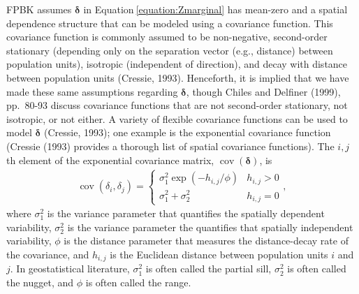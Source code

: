 \documentclass[]{elsarticle} %
\begin{document}
FPBK assumes \(\bm{\delta}\) in Equation\(~\)\ref{equation:Zmarginal}
has mean-zero and a spatial dependence structure that can be modeled
using a covariance function. This covariance function is commonly
assumed to be non-negative, second-order stationary (depending only on
the separation vector (e.g., distance) between population units),
isotropic (independent of direction), and decay with distance between
population units (Cressie, 1993). Henceforth, it is implied that we have
made these same assumptions regarding \(\bm{\delta}\), though Chiles and
Delfiner (1999), pp.~80-93 discuss covariance functions that are not
second-order stationary, not isotropic, or not either. A variety of
flexible covariance functions can be used to model \(\bm{\delta}\)
(Cressie, 1993); one example is the exponential covariance function
(Cressie (1993) provides a thorough list of spatial covariance
functions). The \(i,j\)th element of the exponential covariance matrix,
\(\mathop{\mathrm{{cov}}}(\bm{\delta})\), is \mbox{}
\begin{align}\label{equation:expcov}
\mathop{\mathrm{{cov}}}(\delta_i, \delta_j) = 
\begin{cases} 
\sigma^2_{1}\exp(-h_{i,j}/\phi) & h_{i,j} > 0 \\
\sigma^2_{1} + \sigma^2_2 & h_{i,j} = 0
\end{cases}
,
\end{align} where \(\sigma^2_{1}\) is the variance parameter that
quantifies the spatially dependent variability, \(\sigma^2_{2}\) is the
variance parameter the quantifies that spatially independent
variability, \(\phi\) is the distance parameter that measures the
distance-decay rate of the covariance, and \(h_{i,j}\) is the Euclidean
distance between population units \(i\) and \(j\). In geostatistical
literature, \(\sigma^2_{1}\) is often called the partial sill,
\(\sigma^2_{2}\) is often called the nugget, and \(\phi\) is often
called the range.
\end{document}
